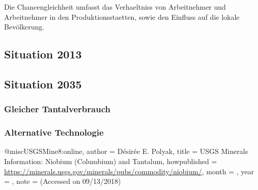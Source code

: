Die Chancengleichheit umfasst das Verhaeltniss von Arbeitnehmer und Arbeitnehmer
in den Produktionsstaetten, sowie den Einfluss auf die lokale Bevölkerung.

\subsection{Situation 2013}




\subsection{Situation 2035}

\subsubsection{Gleicher Tantalverbrauch}

\subsubsection{Alternative Technologie}


@misc{USGSMine8:online, author = {Désirée E. Polyak}, title = {USGS Minerals
Information: Niobium (Columbium) and Tantalum}, howpublished =
{\url{https://minerals.usgs.gov/minerals/pubs/commodity/niobium/}}, month = {},
year = {}, note = {(Accessed on 09/13/2018)} }

